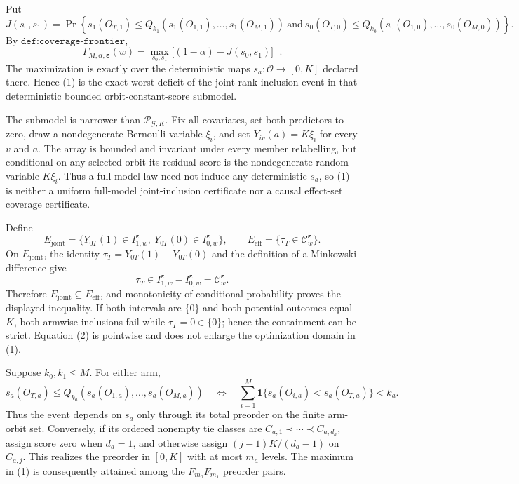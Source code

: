 Put
\[
J(s_0,s_1)=\Pr\!\left\{s_1(O_{T,1})\le Q_{k_1}(s_1(O_{1,1}),\ldots,s_1(O_{M,1}))\ \text{and}\ s_0(O_{T,0})\le Q_{k_0}(s_0(O_{1,0}),\ldots,s_0(O_{M,0}))\right\}.
\]
By \(\texttt{def:coverage-frontier}\),
\[
\Gamma_{M,\alpha,\boldsymbol\varepsilon}(w)=\max_{s_0,s_1}\bigl[(1-\alpha)-J(s_0,s_1)\bigr]_+.
\tag{1}
\]
The maximization is exactly over the deterministic maps \(s_a:\mathcal O\to[0,K]\) declared there. Hence (1) is the exact worst deficit of the joint rank-inclusion event in that deterministic bounded orbit-constant-score submodel.

The submodel is narrower than \(\mathcal P_{\mathcal G,K}\). Fix all covariates, set both predictors to zero, draw a nondegenerate Bernoulli variable \(\xi_i\), and set \(Y_{iv}(a)=K\xi_i\) for every \(v\) and \(a\). The array is bounded and invariant under every member relabelling, but conditional on any selected orbit its residual score is the nondegenerate random variable \(K\xi_i\). Thus a full-model law need not induce any deterministic \(s_a\), so (1) is neither a uniform full-model joint-inclusion certificate nor a causal effect-set coverage certificate.

Define
\[
E_{\mathrm{joint}}=\{Y_{0T}(1)\in I^{\boldsymbol\varepsilon}_{1,w},\ Y_{0T}(0)\in I^{\boldsymbol\varepsilon}_{0,w}\},\qquad E_{\mathrm{eff}}=\{\tau_T\in\mathcal C^{\boldsymbol\varepsilon}_w\}.
\]
On \(E_{\mathrm{joint}}\), the identity \(\tau_T=Y_{0T}(1)-Y_{0T}(0)\) and the definition of a Minkowski difference give
\[
\tau_T\in I^{\boldsymbol\varepsilon}_{1,w}-I^{\boldsymbol\varepsilon}_{0,w}=\mathcal C^{\boldsymbol\varepsilon}_w.
\tag{2}
\]
Therefore \(E_{\mathrm{joint}}\subseteq E_{\mathrm{eff}}\), and monotonicity of conditional probability proves the displayed inequality. If both intervals are \(\{0\}\) and both potential outcomes equal \(K\), both armwise inclusions fail while \(\tau_T=0\in\{0\}\); hence the containment can be strict. Equation (2) is pointwise and does not enlarge the optimization domain in (1).

Suppose \(k_0,k_1\le M\). For either arm,
\[
s_a(O_{T,a})\le Q_{k_a}(s_a(O_{1,a}),\ldots,s_a(O_{M,a}))\quad\Longleftrightarrow\quad\sum_{i=1}^M\mathbf 1\{s_a(O_{i,a})<s_a(O_{T,a})\}<k_a.
\tag{3}
\]
Thus the event depends on \(s_a\) only through its total preorder on the finite arm-orbit set. Conversely, if its ordered nonempty tie classes are \(C_{a,1}\prec\cdots\prec C_{a,d_a}\), assign score zero when \(d_a=1\), and otherwise assign \((j-1)K/(d_a-1)\) on \(C_{a,j}\). This realizes the preorder in \([0,K]\) with at most \(m_a\) levels. The maximum in (1) is consequently attained among the \(F_{m_0}F_{m_1}\) preorder pairs.

